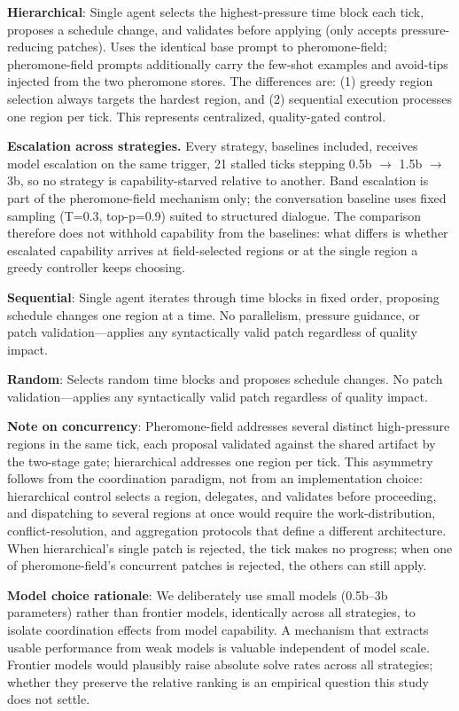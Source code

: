 \textbf{Hierarchical}: Single agent selects the highest-pressure time block each tick, proposes a schedule change, and validates before applying (only accepts pressure-reducing patches). Uses the identical base prompt to pheromone-field; pheromone-field prompts additionally carry the few-shot examples and avoid-tips injected from the two pheromone stores. The differences are: (1) greedy region selection always targets the hardest region, and (2) sequential execution processes one region per tick. This represents centralized, quality-gated control.

\textbf{Escalation across strategies.} Every strategy, baselines included, receives model escalation on the same trigger, 21 stalled ticks stepping 0.5b $\to$ 1.5b $\to$ 3b, so no strategy is capability-starved relative to another. Band escalation is part of the pheromone-field mechanism only; the conversation baseline uses fixed sampling (T=0.3, top-p=0.9) suited to structured dialogue. The comparison therefore does not withhold capability from the baselines: what differs is whether escalated capability arrives at field-selected regions or at the single region a greedy controller keeps choosing.

\textbf{Sequential}: Single agent iterates through time blocks in fixed order, proposing schedule changes one region at a time. No parallelism, pressure guidance, or patch validation---applies any syntactically valid patch regardless of quality impact.

\textbf{Random}: Selects random time blocks and proposes schedule changes. No patch validation---applies any syntactically valid patch regardless of quality impact.

\textbf{Note on concurrency}: Pheromone-field addresses several distinct high-pressure regions in the same tick, each proposal validated against the shared artifact by the two-stage gate; hierarchical addresses one region per tick. This asymmetry follows from the coordination paradigm, not from an implementation choice: hierarchical control selects a region, delegates, and validates before proceeding, and dispatching to several regions at once would require the work-distribution, conflict-resolution, and aggregation protocols that define a different architecture. When hierarchical's single patch is rejected, the tick makes no progress; when one of pheromone-field's concurrent patches is rejected, the others can still apply.

\textbf{Model choice rationale}: We deliberately use small models (0.5b--3b parameters) rather than frontier models, identically across all strategies, to isolate coordination effects from model capability. A mechanism that extracts usable performance from weak models is valuable independent of model scale. Frontier models would plausibly raise absolute solve rates across all strategies; whether they preserve the relative ranking is an empirical question this study does not settle.

